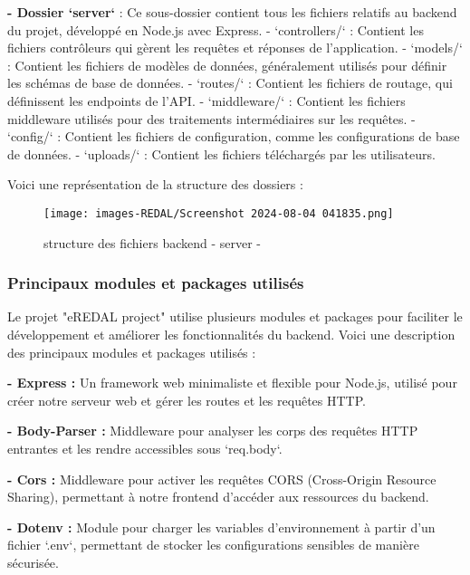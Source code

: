 \textbf{- Dossier `server`} : Ce sous-dossier contient tous les fichiers relatifs au backend du projet, développé en Node.js avec Express.
  - `controllers/` : Contient les fichiers contrôleurs qui gèrent les requêtes et réponses de l'application.
  - `models/` : Contient les fichiers de modèles de données, généralement utilisés pour définir les schémas de base de données.
  - `routes/` : Contient les fichiers de routage, qui définissent les endpoints de l'API.
  - `middleware/` : Contient les fichiers middleware utilisés pour des traitements intermédiaires sur les requêtes.
  - `config/` : Contient les fichiers de configuration, comme les configurations de base de données.
  - `uploads/` : Contient les fichiers téléchargés par les utilisateurs.

Voici une représentation de la structure des dossiers :

\begin{figure}[H]
\begin{center}
\texttt{[image: images-REDAL/Screenshot 2024-08-04 041835.png]}
\end{center}
\caption{structure des fichiers backend - server -}
\end{figure}



\subsubsection{Principaux modules et packages utilisés}

Le projet "eREDAL project" utilise plusieurs modules et packages pour faciliter le développement et améliorer les fonctionnalités du backend. Voici une description des principaux modules et packages utilisés :

\textbf{- Express :} Un framework web minimaliste et flexible pour Node.js, utilisé pour créer notre serveur web et gérer les routes et les requêtes HTTP.



\textbf{- Body-Parser :} Middleware pour analyser les corps des requêtes HTTP entrantes et les rendre accessibles sous `req.body`.


\textbf{- Cors :} Middleware pour activer les requêtes CORS (Cross-Origin Resource Sharing), permettant à notre frontend d'accéder aux ressources du backend.


\textbf{- Dotenv :} Module pour charger les variables d'environnement à partir d'un fichier `.env`, permettant de stocker les configurations sensibles de manière sécurisée.

